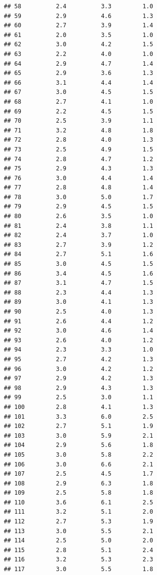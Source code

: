 \documentclass[
]{book}
\begin{document}
\begin{verbatim}
## 58          2.4          3.3         1.0
## 59          2.9          4.6         1.3
## 60          2.7          3.9         1.4
## 61          2.0          3.5         1.0
## 62          3.0          4.2         1.5
## 63          2.2          4.0         1.0
## 64          2.9          4.7         1.4
## 65          2.9          3.6         1.3
## 66          3.1          4.4         1.4
## 67          3.0          4.5         1.5
## 68          2.7          4.1         1.0
## 69          2.2          4.5         1.5
## 70          2.5          3.9         1.1
## 71          3.2          4.8         1.8
## 72          2.8          4.0         1.3
## 73          2.5          4.9         1.5
## 74          2.8          4.7         1.2
## 75          2.9          4.3         1.3
## 76          3.0          4.4         1.4
## 77          2.8          4.8         1.4
## 78          3.0          5.0         1.7
## 79          2.9          4.5         1.5
## 80          2.6          3.5         1.0
## 81          2.4          3.8         1.1
## 82          2.4          3.7         1.0
## 83          2.7          3.9         1.2
## 84          2.7          5.1         1.6
## 85          3.0          4.5         1.5
## 86          3.4          4.5         1.6
## 87          3.1          4.7         1.5
## 88          2.3          4.4         1.3
## 89          3.0          4.1         1.3
## 90          2.5          4.0         1.3
## 91          2.6          4.4         1.2
## 92          3.0          4.6         1.4
## 93          2.6          4.0         1.2
## 94          2.3          3.3         1.0
## 95          2.7          4.2         1.3
## 96          3.0          4.2         1.2
## 97          2.9          4.2         1.3
## 98          2.9          4.3         1.3
## 99          2.5          3.0         1.1
## 100         2.8          4.1         1.3
## 101         3.3          6.0         2.5
## 102         2.7          5.1         1.9
## 103         3.0          5.9         2.1
## 104         2.9          5.6         1.8
## 105         3.0          5.8         2.2
## 106         3.0          6.6         2.1
## 107         2.5          4.5         1.7
## 108         2.9          6.3         1.8
## 109         2.5          5.8         1.8
## 110         3.6          6.1         2.5
## 111         3.2          5.1         2.0
## 112         2.7          5.3         1.9
## 113         3.0          5.5         2.1
## 114         2.5          5.0         2.0
## 115         2.8          5.1         2.4
## 116         3.2          5.3         2.3
## 117         3.0          5.5         1.8

\end{verbatim}
\end{document}
